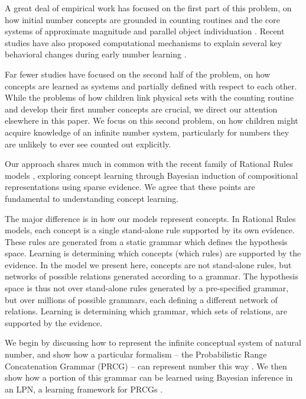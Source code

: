 \documentclass[10pt,letterpaper]{article}
\begin{document}
A great deal of empirical work has focused on the first part of this
problem, on how initial number concepts are grounded in counting
routines and the core systems of approximate magnitude and parallel
object individuation
\citep{Car2009,dehaene2011number,feigenson2004core}. Recent studies
have also proposed computational mechanisms to explain several key
behavioral changes during early number learning
\citep{PianGoodTen2012}.

Far fewer studies have focused on the second half of the problem, on
how concepts are learned as systems and partially defined with respect
to each other. While the problems of how children link physical sets
with the counting routine and develop their first number concepts are
crucial, we direct our attention elsewhere in this paper. We focus on
this second problem, on how children might acquire knowledge of an
infinite number system, particularly for numbers they are unlikely to
ever see counted out explicitly.

Our approach shares much in common with the recent family of Rational
Rules models
\citep{goodman2008rational,T.D.Ullman:2012:1b1b6,PianGoodTen2012},
exploring concept learning through Bayesian induction of compositional
representations using sparse evidence. We agree that these points are
fundamental to understanding concept learning.

The major difference is in how our models represent concepts. In
Rational Rules models, each concept is a single stand-alone rule
supported by its own evidence. These rules are generated from a static
grammar which defines the hypothesis space. Learning is determining
which concepts (which rules) are supported by the evidence. In the
model we present here, concepts are not stand-alone rules, but
networks of possible relations generated according to a grammar. The
hypothesis space is thus not over stand-alone rules generated by a
pre-specified grammar, but over millions of possible grammars, each
defining a different network of relations. Learning is determining
which grammar, which sets of relations, are supported by the evidence.

We begin by discussing how to represent the infinite conceptual system
of natural number, and show how a particular formalism -- the
Probabilistic Range Concatenation Grammar (PRCG) -- can represent
number this way \citep{boullier2005range}. We then show how a portion
of this grammar can be learned using Bayesian inference in an LPN, a
learning framework for PRCGs \citep{DecRulTen2015}.
\end{document}
